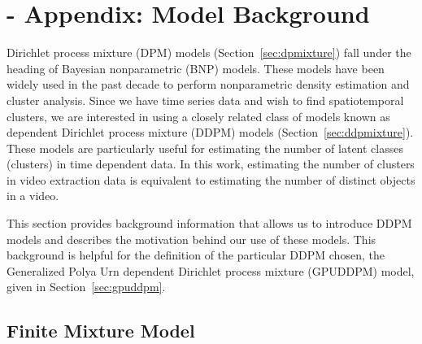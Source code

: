 \documentclass[twocolumn, final]{svjour3}
\begin{document}

\appendix

\section{-  Appendix: Model Background}
\label{sec:modelbackground}

Dirichlet process mixture (DPM) models (Section~\ref{sec:dpmixture}) fall under the heading of Bayesian nonparametric (BNP) models. These models have been widely used in the past decade to perform nonparametric density estimation and cluster analysis. Since we have time series data and wish to find spatiotemporal clusters, we are interested in using a closely related class of models known as dependent Dirichlet process mixture (DDPM) models (Section~\ref{sec:ddpmixture}). These models are particularly useful for estimating the number of latent classes (clusters) in time dependent data. In this work, estimating the number of clusters in video extraction data is equivalent to estimating the number of distinct objects in a video.

This section provides background information that allows us to introduce DDPM models and describes the motivation behind our use of these models. This background is helpful for the definition of the particular DDPM chosen, the Generalized Polya Urn dependent Dirichlet process mixture (GPUDDPM) model, given in Section~\ref{sec:gpuddpm}.


\subsection{Finite Mixture Model}
\label{sec:finitemixture}
\end{document}
